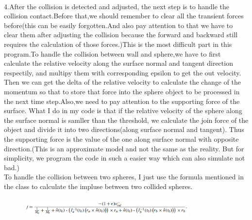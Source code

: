 \documentclass[acmtog]{acmart}
\begin{document}
\\\indent 4.After the collision is detected and adjusted, the next step is to handle the collision contact.Before that,we should remember to clear all the transient forces before(this can be easily forgotten.And also pay attention to that we have to clear them after adjusting the collision because the forward and backward still requires the calculation of those forces.)This is the most difficult part in this program.To handle the collision between wall and sphere,we have to first calculate the relative velocity along the surface normal and tangent direction respectily, and multipy them with corresponding epsilon to get the out velocity. Then we can get the delta of the relative velocity to calculate the change of the momentum so that to store that force into the sphere object to be processed in the next time step.Also,we need to pay attention to the supporting force of the surface. What I do in my code is that if the relative velocity of the sphere along the surface normal is samller than the threshold, we calculate the join force of the object and divide it into two directions(along surface normal and tangent). Thus the supporting force is the value of the one along surface normal with opposite direction.(This is an approximate model and not the same as the reality. But for simplicity, we program the code in such a easier way which can also simulate not bad.)
\\\indent To handle the collision between two spheres, I just use the formula mentioned in the class to calculate the impluse between two collided spheres.
\begin{figure}[h]
	\centering
	\includegraphics[width=9cm,height=1cm]{formula.PNG}
\end{figure}
\end{document}
